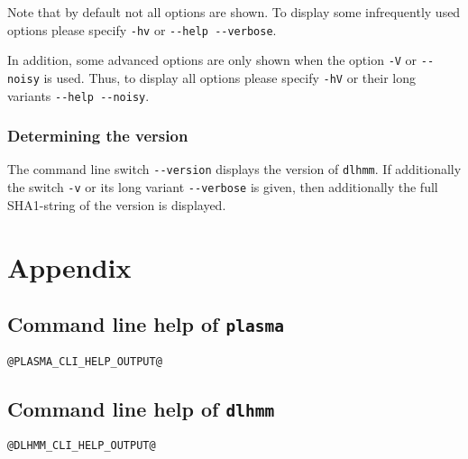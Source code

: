 \documentclass[a4paper]{article}
\newcommand{\plasma}[0]{\texttt{plasma}}
\newcommand{\dlhmm}[0]{\texttt{dlhmm}}
\begin{document}
Note that by default not all options are shown.
To display some infrequently used options please specify \verb|-hv| or \verb|--help --verbose|.

In addition, some advanced options are only shown when the option \verb|-V| or \verb|--noisy| is used.
Thus, to display all options please specify \verb|-hV| or their long variants \verb|--help --noisy|.

\subsubsection{Determining the version}
The command line switch \verb|--version| displays the version of \dlhmm{}.
If additionally the switch \verb|-v| or its long variant \verb|--verbose| is given, then additionally the full SHA1-string of the version is displayed.


\section{Appendix}
\subsection{Command line help of \plasma{}}
\label{appendix:plasma-cli-help}
\begin{verbatim}
@PLASMA_CLI_HELP_OUTPUT@
\end{verbatim}

\subsection{Command line help of \dlhmm{}}
\label{appendix:dlhmm-cli-help}
\begin{verbatim}
@DLHMM_CLI_HELP_OUTPUT@
\end{verbatim}



\nocite{*}
{}


\end{document}

